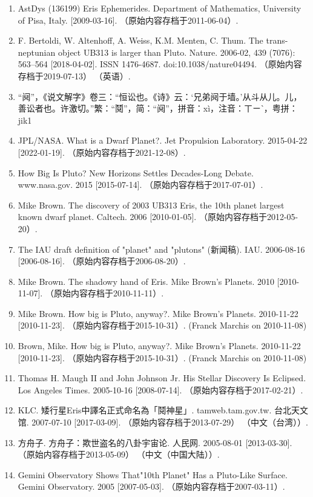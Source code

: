 \begin{enumerate}
\item AstDys (136199) Eris Ephemerides. Department of Mathematics, University of Pisa, Italy. [2009-03-16]. （原始内容存档于2011-06-04）.
\item F. Bertoldi, W. Altenhoff, A. Weiss, K.M. Menten, C. Thum. The trans-neptunian object UB313 is larger than Pluto. Nature. 2006-02, 439 (7076): 563–564 [2018-04-02]. ISSN 1476-4687. doi:10.1038/nature04494. （原始内容存档于2019-07-13） （英语）.
\item “阋”，《说文解字》卷三：“恒讼也。《诗》云：‘兄弟阋于墙。’从斗从儿。儿，善讼者也。许激切。”繁：“鬩”，简：“阋”，拼音：xì，注音：ㄒㄧˋ，粤拼：jik1
\item JPL/NASA. What is a Dwarf Planet?. Jet Propulsion Laboratory. 2015-04-22 [2022-01-19]. （原始内容存档于2021-12-08）.
\item How Big Is Pluto? New Horizons Settles Decades-Long Debate. www.nasa.gov. 2015 [2015-07-14]. （原始内容存档于2017-07-01）.
\item Mike Brown. The discovery of 2003 UB313 Eris, the 10th planet largest known dwarf planet. Caltech. 2006 [2010-01-05]. （原始内容存档于2012-05-20）.
\item The IAU draft definition of "planet" and "plutons" (新闻稿). IAU. 2006-08-16 [2006-08-16]. （原始内容存档于2006-08-20）.
\item Mike Brown. The shadowy hand of Eris. Mike Brown's Planets. 2010 [2010-11-07]. （原始内容存档于2010-11-11）.
\item Mike Brown. How big is Pluto, anyway?. Mike Brown's Planets. 2010-11-22 [2010-11-23]. （原始内容存档于2015-10-31）. (Franck Marchis on 2010-11-08)
\item Brown, Mike. How big is Pluto, anyway?. Mike Brown's Planets. 2010-11-22 [2010-11-23]. （原始内容存档于2015-10-31）. (Franck Marchis on 2010-11-08)
\item Thomas H. Maugh II and John Johnson Jr. His Stellar Discovery Is Eclipsed. Los Angeles Times. 2005-10-16 [2008-07-14]. （原始内容存档于2017-02-21）.
\item KLC. 矮行星Eris中譯名正式命名為「鬩神星」. tamweb.tam.gov.tw. 台北天文馆. 2007-07-10 [2017-03-09]. （原始内容存档于2013-07-29） （中文（台湾））.
\item 方舟子. 方舟子：欺世盗名的八卦宇宙论. 人民网. 2005-08-01 [2013-03-30]. （原始内容存档于2013-05-09） （中文（中国大陆））.
\item Gemini Observatory Shows That"10th Planet" Has a Pluto-Like Surface. Gemini Observatory. 2005 [2007-05-03]. （原始内容存档于2007-03-11）.

\end{enumerate}
